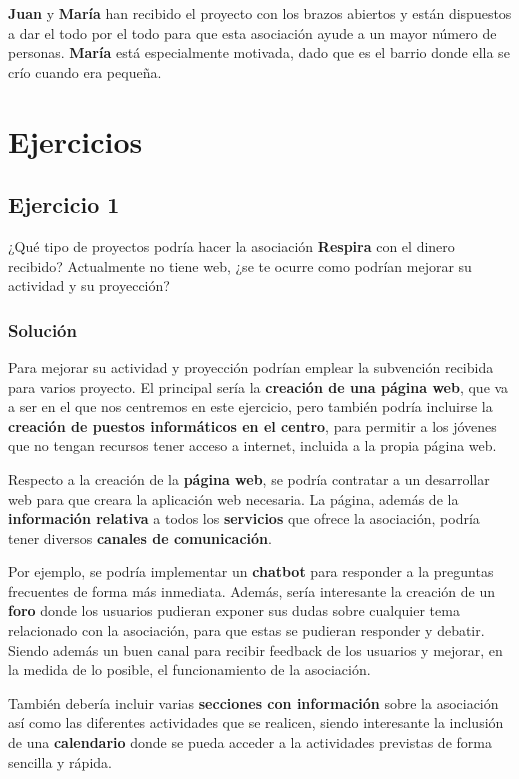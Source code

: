 \textbf{Juan} y \textbf{María} han recibido el proyecto con los brazos abiertos y están dispuestos a dar el todo por el todo para que esta asociación ayude a un mayor número de personas. \textbf{María} está especialmente motivada, dado que es el barrio donde ella se crío cuando era pequeña.

\section{Ejercicios}

\subsection{Ejercicio 1}
¿Qué tipo de proyectos podría hacer la asociación \textbf{Respira} con el dinero recibido? Actualmente no tiene web, ¿se te ocurre como podrían mejorar su actividad y su proyección?

\subsubsection{Solución}
Para mejorar su actividad y proyección podrían emplear la subvención recibida para varios proyecto. El principal sería la \textbf{creación de una página web}, que va a ser en el que nos centremos en este ejercicio, pero también podría incluirse la \textbf{creación de puestos informáticos en el centro}, para permitir a los jóvenes que no tengan recursos tener acceso a internet, incluida a la propia página web.

Respecto a la creación de la \textbf{página web}, se podría contratar a un desarrollar web para que creara la aplicación web necesaria. La página, además de la \textbf{información relativa} a todos los \textbf{servicios} que ofrece la asociación, podría tener diversos \textbf{canales de comunicación}.

Por ejemplo, se podría implementar un \textbf{chatbot} para responder a la preguntas frecuentes de forma más inmediata. Además, sería interesante la creación de un \textbf{foro} donde los usuarios pudieran exponer sus dudas sobre cualquier tema relacionado con la asociación, para que estas se pudieran responder y debatir. Siendo además un buen canal para recibir feedback de los usuarios y mejorar, en la medida de lo posible, el funcionamiento de la asociación.

También debería incluir varias \textbf{secciones con información} sobre la asociación así como las diferentes actividades que se realicen, siendo interesante la inclusión de una \textbf{calendario} donde se pueda acceder a la actividades previstas de forma sencilla y rápida.

